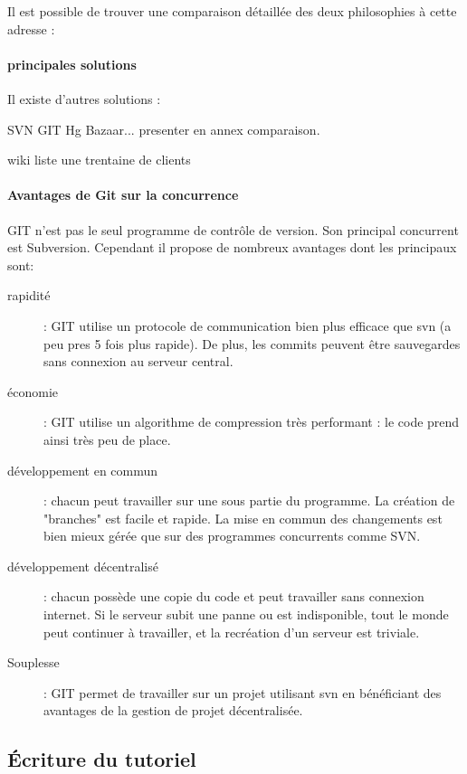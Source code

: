Il est possible de trouver une comparaison détaillée des deux philosophies à cette adresse :



\paragraph{principales solutions}

Il existe d'autres solutions :


SVN GIT Hg Bazaar...
presenter en annex comparaison.

wiki liste une trentaine de clients



\paragraph{Avantages de Git sur la concurrence}

GIT n'est pas le seul programme de contrôle de version. Son principal concurrent est Subversion.
Cependant il propose de nombreux avantages dont les principaux sont:
\begin{description}
  \item[rapidité] : GIT utilise un protocole de communication bien plus efficace que svn (a peu pres 5 fois plus rapide). 
  De plus, les commits peuvent être sauvegardes sans connexion au serveur central.
  \item[économie] : GIT utilise un algorithme de compression très performant : le code prend ainsi très peu de place.
  \item[développement en commun] : chacun peut travailler sur une sous partie du programme. La création de "branches" est facile et
  rapide. La mise en commun des changements est bien mieux gérée que sur des programmes concurrents comme SVN.
  \item[développement décentralisé] : chacun possède une copie du code et peut travailler sans connexion internet. 
  Si le serveur subit une panne ou est indisponible, tout le monde peut continuer à travailler, et la recréation d'un serveur est triviale.
  \item[Souplesse] : GIT permet de travailler sur un projet utilisant svn en bénéficiant des avantages de la gestion de projet
  décentralisée.
\end{description}


\subsection{Écriture du tutoriel}

